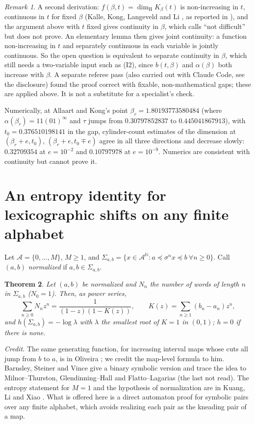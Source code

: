 \documentclass[11pt]{amsart}
\newtheorem{theorem}{Theorem}[section]
\theoremstyle{remark}
\newtheorem{remark}[theorem]{Remark}
\newcommand{\N}{\mathbb{N}}
\newcommand{\dimH}{\dim_{\mathrm H}}
\newcommand{\lex}{\preccurlyeq}
\begin{document}
\begin{remark}
A second derivation: $f(\beta,t)=\dimH K_\beta(t)$ is non-increasing in $t$, continuous in $t$ for fixed $\beta$ (Kalle, Kong, Langeveld and Li \cite{KKLL}, as reported in \cite{AKcrit,AKplat}), and the argument above with $t$ fixed gives continuity in $\beta$, which \cite[Remark~1.10]{AKcrit} calls ``not difficult'' but does not prove. An elementary lemma then gives joint continuity: a function non-increasing in $t$ and separately continuous in each variable is jointly continuous. So the open question is equivalent to separate continuity in $\beta$, which still needs a two-variable input such as (I2), since $b(t,\beta)$ and $\alpha(\beta)$ both increase with $\beta$. A separate referee pass (also carried out with Claude Code, see the disclosure) found the proof correct with fixable, non-mathematical gaps; these are applied above. It is not a substitute for a specialist's check.
\end{remark}

Numerically, at Allaart and Kong's point $\beta_r=1.80193773580484$ (where $\alpha(\beta_r)=11(01)^\infty$ and $\tau$ jumps from $0.30797852837$ to $0.445041867913$), with $t_0=0.376510198141$ in the gap, cylinder-count estimates of the dimension at $(\beta_r+e,t_0)$, $(\beta_r+e,t_0\mp e)$ agree in all three directions and decrease slowly: $0.32709354$ at $e=10^{-2}$ and $0.10797978$ at $e=10^{-9}$. Numerics are consistent with continuity but cannot prove it.

\section{An entropy identity for lexicographic shifts on any finite alphabet}\label{sec:symbolic}

Let $\mathcal A=\{0,\dots,M\}$, $M\ge1$, and $\Sigma_{a,b}=\{x\in\mathcal A^\N:a\lex\sigma^nx\lex b\ \forall n\ge0\}$. Call $(a,b)$ \emph{normalized} if $a,b\in\Sigma_{a,b}$.

\begin{theorem}\label{thm:sym}
Let $(a,b)$ be normalized and $N_n$ the number of words of length $n$ in $\Sigma_{a,b}$ ($N_0=1$). Then, as power series,
\[
\sum_{n\ge0}N_nz^n=\frac{1}{(1-z)(1-K(z))},\qquad K(z)=\sum_{n\ge1}(b_n-a_n)z^n,
\]
and $h(\Sigma_{a,b})=-\log\lambda$ with $\lambda$ the smallest root of $K=1$ in $(0,1)$; $h=0$ if there is none.
\end{theorem}

\emph{Credit.} The same generating function, for increasing interval maps whose cuts all jump from $b$ to $a$, is in Oliveira \cite[Section~10, eq.~(28), and Theorem~4.2]{Oliveira}; we credit the map-level formula to him. Barnsley, Steiner and Vince \cite[Lemma~3]{BSV} give a binary symbolic version and trace the idea to Milnor--Thurston, Glendinning--Hall and Flatto--Lagarias (the last not read). The entropy statement for $M=1$ and the hypothesis of normalization are in Kuang, Li and Xiao \cite[Theorem~4.3]{KLX}. What is offered here is a direct automaton proof for symbolic pairs over any finite alphabet, which avoids realizing each pair as the kneading pair of a map.
\end{document}
